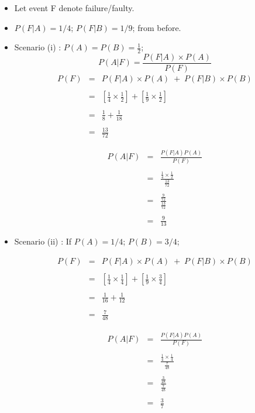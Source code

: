 \documentclass[a4paper,12pt]{article}
\begin{document}
\begin{itemize}
\item  Let event F denote failure/faulty.
\item   $P(F|A) = 1/4$; $P(F|B) = 1/9$; from before.

\item Scenario (i) : ${  \displaystyle P(A) = P(B) = \frac{1}{2}  }$; 
\[P(A|F) = \frac{P(F|A) \times P(A)}{P(F)}\] 
\begin{eqnarray*}
P(F) &=&  P(F|A)\times P(A) \;+\; P(F|B) \times P(B) \\ 
& & \\
&=& \left[\frac{1}{4} \times \frac{1}{2} \right] + \left[\frac{1}{9} \times \frac{1}{2} \right] \\
& & \\
&=& \frac{1}{8} + \frac{1}{18}\\
& & \\
&=& \frac{13}{72}
\end{eqnarray*}

\begin{eqnarray*}
P(A|F) &=& \frac{P(F|A)P(A)}{P(F)} \\ 
& & \\
&=& \frac{\frac{1}{4} \times \frac{1}{2}}{\frac{13}{72}}\\
& & \\
&=& \frac{\frac{9}{72} }{\frac{13}{72}}\\
& & \\
&=& \frac{9}{13} 
\end{eqnarray*}
\bigskip 
\item Scenario (ii) :  If $P(A) = 1/4$; $P(B) = 3/4$;

\begin{eqnarray*}
P(F) &=&  P(F|A)\times P(A) \;+\; P(F|B) \times P(B) \\ 
& & \\
&=& \left[\frac{1}{4} \times \frac{1}{4} \right] + \left[\frac{1}{9} \times \frac{3}{4} \right] \\
& & \\
&=& \frac{1}{16} + \frac{1}{12}\\
& & \\
&=& \frac{7}{48}
\end{eqnarray*}


\begin{eqnarray*}
P(A|F) &=& \frac{P(F|A)P(A)}{P(F)} \\ 
& & \\
&=& \frac{\frac{1}{4} \times \frac{1}{4}}{\frac{7}{48}}\\
& & \\
&=& \frac{\frac{3}{48} }{\frac{7}{48}}\\
& & \\
&=& \frac{ 3 }{7}\\
\end{eqnarray*}

\end{itemize}
\end{document}
